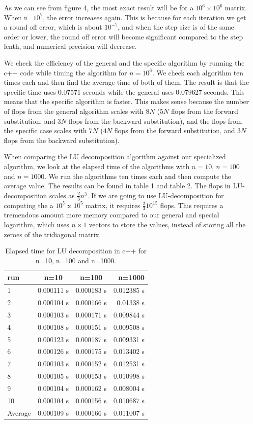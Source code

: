 \documentclass[%
oneside,                 %
final,                   %
10pt]{article}
\begin{document}
As we can see from figure 4, the most exact result will be for a $10^6\times 10^6$ matrix. When n=$10^7$, the error increases again. This is because for each iteration we get a round off error, which is about $10^{-7}$, and when the step size is of the same order or lower, the round off error will become significant compared to the step lenth, and numerical precision will decrease.


We check the efficiency of the general and the specific algorithm by running the c++ code while timing the algorithm for $n=10^6$. We check each algorithm ten times each and then find the average time of both of them. The result is that the specific time uses 0.07571 seconds while the general uses 0.079627 seconds. This means that the specific algorithm is faster.
This makes sense because the number of flops from the general algorithm scales with $8N$ ($5N$ flops from the forward substitution, and $3N$ flops from the backward substitution), and the flops from the specific case scales with $7N$ ($4N$ flops from the forward substitution, and $3N$ flops from the backward substitution).

When comparing the LU decomposition algorithm against our specialized algorithm, we look at the elapsed time of the algorithms with $n=10$, $n=100$ and $n=1000$. We run the algorithms ten times each and then compute the average value. The results can be found in table 1 and table 2.
The flops in LU-decomposition scales as $\frac{2}{3} n^3$. If we are going to use LU-decomposition for computing the a $10^5$ x $10^5$ matrix, it requires $\frac{2}{3}10^{15}$ flops. This requires a tremendous amount more memory compared to our general and special logarithm, which uses $n\times 1$ vectors to store the values, instead of storing all the zeroes of the tridiagonal matrix.

\begin{table}[H]
    \centering
    \begin{tabular}{|l|c|c|r|}
    \hline
     run & n=10 & n=100 & n=1000\\
     \hline
      1  & 0.000111 s & 0.000183 s & 0.012385 s\\
      2  & 0.000104 s & 0.000166 s & 0.01338 s\\
      3  & 0.000103 s & 0.000171 s & 0.009844 s\\
      4  & 0.000108 s & 0.000151 s & 0.009508 s\\
      5  & 0.000123 s & 0.000187 s & 0.009331 s\\
      6  & 0.000126 s & 0.000175 s & 0.013402 s\\
      7  & 0.000103 s & 0.000152 s & 0.012531 s\\
      8  & 0.000105 s & 0.000153 s & 0.010998 s\\
      9  & 0.000104 s & 0.000162 s & 0.008004 s\\
      10 & 0.000104 s & 0.000156 s & 0.010687 s\\
      \hline
      Average & 0.000109 s & 0.000166 s & 0.011007 s\\
      \hline
    \end{tabular}
    \caption{Elapsed time for LU decomposition in c++ for n=10, n=100 and n=1000.}
    \label{tab:my_label}
\end{table}
\end{document}
